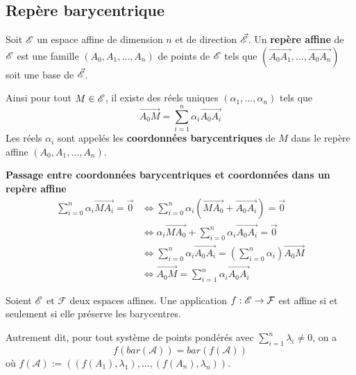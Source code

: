 \documentclass[a4paper,12pt]{article}
\begin{document}
\subsection{Repère barycentrique}

\begin{definition}
    Soit $\mathscr{E}$ un espace affine de dimension $n$ et de direction $\vec{\mathscr{E}}$. Un \textbf{repère affine} de $\mathscr{E}$ est une famille $(A_0, A_1, \ldots, A_n)$ de points de $\mathscr{E}$ tels que
    $(\overrightarrow{A_0 A_1}, \ldots, \overrightarrow{A_0 A_n})$ soit une base de $\vec{\mathscr{E}}$.

    Ainsi pour tout $M \in \mathscr{E}$, il existe des réels uniques $(\alpha_1, \ldots, \alpha_n)$ tels que
    $$
    \overrightarrow{A_0 M} = \sum_{i=1}^n \alpha_i \overrightarrow{A_0 A_i}
    $$
    Les réels $\alpha_i$ sont appelés les \textbf{coordonnées barycentriques} de $M$ dans le repère affine $(A_0, A_1, \ldots, A_n)$.
\end{definition}

\begin{methode}
    \textbf{Passage entre coordonnées barycentriques et coordonnées dans un repère affine}
    \begin{align*}
        \sum_{i=0}^n \alpha_i \overrightarrow{M A_i} = \vec{0} &\iff \sum_{i=0}^n \alpha_i (\overrightarrow{MA_0} + \overrightarrow{A_0 A_i}) = \vec{0} \\
        &\iff \alpha_i \overrightarrow{M A_0} + \sum_{i=0}^n \alpha_i \overrightarrow{A_0 A_i} = \vec{0} \\
        &\iff \sum_{i=0}^n \alpha_i \overrightarrow{A_0 A_i} = (\sum_{i=0}^n \alpha_i) \overrightarrow{A_0 M} \\
        &\iff \overrightarrow{A_0 M} = \sum_{i=1}^n \alpha_i \overrightarrow{A_0 A_i}
    \end{align*}
\end{methode}

\clearpage

\begin{proposition}{}{}
    Soient $\mathscr{E}$ et $\mathcal{F}$ deux espaces affines. Une application $f: \mathscr{E} \to \mathcal{F}$ est affine si et seulement si elle préserve les barycentres.
    
    \vspace{0.5cm}
    Autrement dit, pour tout système de points pondérés  avec $\sum_{i=1}^n \lambda_i \neq 0$, on a
    $$
    f(bar(\mathcal{A})) = bar(f(\mathcal{A}))
    $$
    où $f(\mathcal{A}) := ((f(A_1), \lambda_1), \dots, (f(A_n), \lambda_n))$.
\end{proposition}
\end{document}
